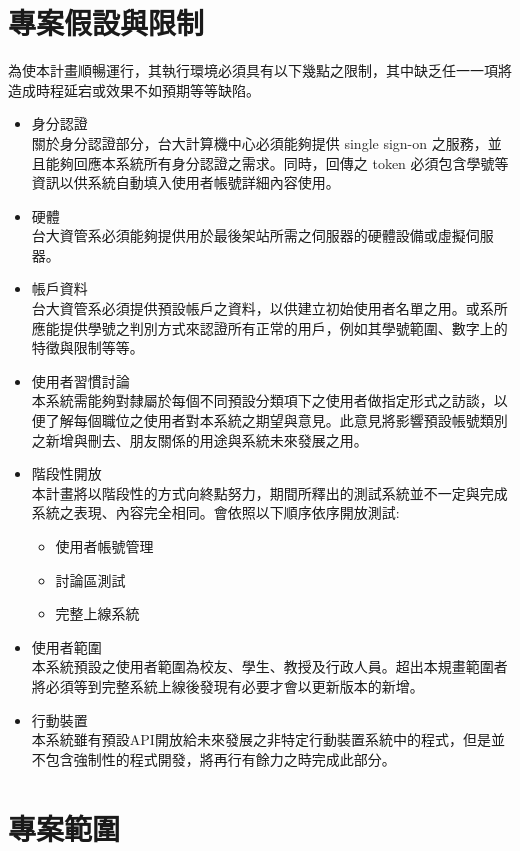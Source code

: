\documentclass[11pt]{article}
\begin{document}
\section{專案假設與限制}

為使本計畫順暢運行，其執行環境必須具有以下幾點之限制，其中缺乏任一一項將造成時程延宕或效果不如預期等等缺陷。

\begin{itemize}
\item{身分認證\\
關於身分認證部分，台大計算機中心必須能夠提供 single sign-on 之服務，並且能夠回應本系統所有身分認證之需求。同時，回傳之 token 必須包含學號等資訊以供系統自動填入使用者帳號詳細內容使用。}
\item{硬體\\
台大資管系必須能夠提供用於最後架站所需之伺服器的硬體設備或虛擬伺服器。}
\item{帳戶資料\\
台大資管系必須提供預設帳戶之資料，以供建立初始使用者名單之用。或系所應能提供學號之判別方式來認證所有正常的用戶，例如其學號範圍、數字上的特徵與限制等等。}
\item{使用者習慣討論\\
本系統需能夠對隸屬於每個不同預設分類項下之使用者做指定形式之訪談，以便了解每個職位之使用者對本系統之期望與意見。此意見將影響預設帳號類別之新增與刪去、朋友關係的用途與系統未來發展之用。}
\item{階段性開放\\
本計畫將以階段性的方式向終點努力，期間所釋出的測試系統並不一定與完成系統之表現、內容完全相同。會依照以下順序依序開放測試:
\begin{itemize}
\item{使用者帳號管理}
\item{討論區測試}
\item{完整上線系統}
\end{itemize}}
\item{使用者範圍\\
本系統預設之使用者範圍為校友、學生、教授及行政人員。超出本規畫範圍者將必須等到完整系統上線後發現有必要才會以更新版本的新增。}
\item{行動裝置\\
本系統雖有預設API開放給未來發展之非特定行動裝置系統中的程式，但是並不包含強制性的程式開發，將再行有餘力之時完成此部分。}
\end{itemize}

\section{專案範圍}
\end{document}
